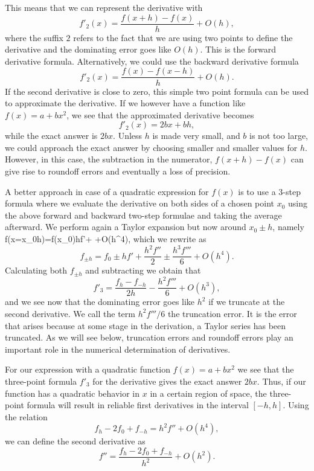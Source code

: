 This means that we can represent the derivative with
%
\[
    f'_{2}(x)= \frac{f(x+h)-f(x)}{h}+O(h),
\]
%
where the suffix $2$ refers to the fact that we are using
two points to define the derivative and the dominating error goes
like $O(h)$. This is the forward derivative formula. Alternatively,
we could use the backward derivative formula
\[
    f'_{2}(x)= \frac{f(x)-f(x-h)}{h}+O(h).
\]
If the second derivative is close to zero, this simple two point
formula can be used  to approximate the derivative.
If we however have a function like 
$f(x)=a+bx^2$, we see that the approximated
derivative becomes
%
\[
    f'_{2}(x) = 2bx+bh,
\]
%
while the exact answer is $2bx$. Unless $h$ is made very small,
and $b$ is not too large, we could approach the exact answer
by choosing smaller and smaller values for $h$. However,
in this case, the subtraction in the numerator, $f(x+h)-f(x)$
can give rise to roundoff errors and eventually a loss of precision. 

A better approach in case of a quadratic expression for 
$f(x)$ is to use a 3-step formula where we evaluate the derivative
on both sides of a chosen point $x_0$ using the above forward and backward 
two-step
formulae  
and taking the average afterward. We perform again
a  Taylor expansion but now around $x_0\pm h$, namely
%
\be \label{eq:htaylor}
  f(x=x_0\pm h)=f(x_0)\pm hf'+\pm{} +O(h^4),
\ee
%
which we rewrite as
%
\[
  f_{\pm h}=f_0\pm hf'+\frac{h^2f''}{2}\pm\frac{h^3f'''}{6} +O(h^4).
\]
%
Calculating both $f_{\pm h}$  and subtracting we obtain that
%
\[
   f'_{3}=\frac{f_h-f_{-h}}{2h} - \frac{h^2f'''}{6} +O(h^3),
\]
%
and we see now that the dominating error goes like $h^2$ if we truncate
at the second derivative. We call the term 
$h^2f'''/6$ the truncation error. It is the error that arises because
at some stage in the derivation, a Taylor series has been truncated. 
As we will see below, truncation errors and roundoff errors play an
important role in the numerical determination of derivatives.

For our expression with a quadratic function $f(x)=a+bx^2$ we
see that the three-point formula $f'_{3}$
for the derivative gives the exact answer $2bx$.
Thus, if our function has a quadratic behavior in $x$ in a certain
region of space, the three-point formula will result in reliable
first derivatives in the interval $[-h,h]$. Using the relation 
\[
  f_h -2f_0 +f_{-h}=h^2f''+O(h^4),
\]
we can define the second derivative as
\[
  f''=\frac{f_h -2f_0 +f_{-h}}{h^2} +O(h^2).
\]

